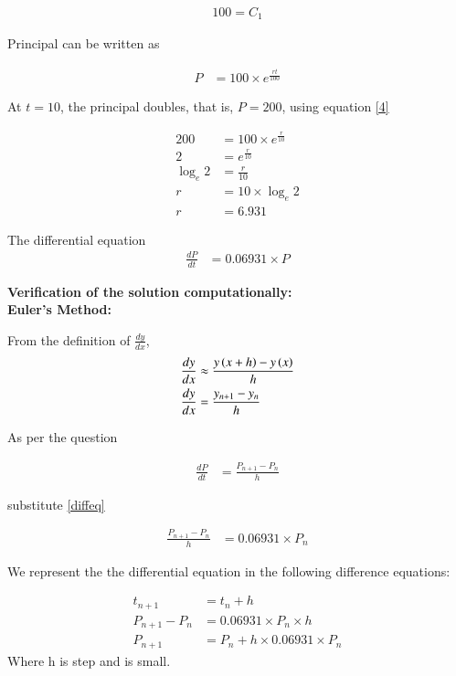 \documentclass[journal]{IEEEtran}
\numberwithin{equation}{enumi}
\numberwithin{figure}{enumi}
\begin{document}
\begin{align}
    100 = C_1
\end{align}

Principal can be written as

\begin{align}
    P &= 100 \times e^{\frac{rt}{100}} \label{4}
\end{align}

At $t = 10$, the principal doubles, that is, $P = 200$, using equation \eqref{4}

\begin{align}
    200 &= 100 \times e^{\frac{r}{10}}\\
    2 &= e^{\frac{r}{10}}\\
    \log_e{2} &= \frac{r}{10}\\
    r &= 10 \times \log_e{2}\\
    r &= 6.931
\end{align}

The differential equation 
\begin{align}
    \frac{dP}{dt} &= 0.06931 \times P \label{diffeq}
\end{align}

\textbf{Verification of the solution computationally:}\\
\textbf{Euler's Method:}

From the definition of $\frac{dy}{dx}$,
\begin{align}
    \frac{dy}{dx} &\approx \frac{y\left(x + h\right) - y\left(x\right)}{h}\\
    \frac{dy}{dx} &= \frac{y_{n+1} - y_n}{h}
\end{align}

As per the question

\begin{align}
    \frac{dP}{dt} &= \frac{P_{n+1} - P_n}{h}
\end{align}

substitute \eqref{diffeq}

\begin{align}
    \frac{P_{n+1} - P_n}{h} &= 0.06931\times P_n
\end{align}

We represent the the differential equation in the following difference equations:

\begin{align}
    t_{n+1} &= t_{n}+h \\
    P_{n+1} - P_n &= 0.06931\times P_n \times h\\
    P_{n+1} &= P_{n}+h \times 0.06931 \times P_n
\end{align}
Where h is step and is small.
\end{document}
